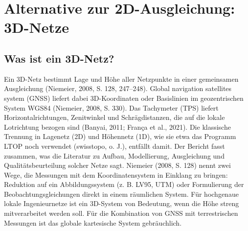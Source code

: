 \section{Alternative zur 2D-Ausgleichung: 3D-Netze}
\label{sec:literaturrecherche 3D-Netze}

\subsection{Was ist ein 3D-Netz?}
Ein 3D-Netz bestimmt Lage und Höhe aller Netzpunkte in einer gemeinsamen Ausgleichung (Niemeier, 2008, S. 128, 247–248). 
Global navigation satellites system (GNSS) liefert dabei 3D-Koordinaten oder Basislinien im geozentrischen System WGS84 (Niemeier, 2008, S. 330). 
Das Tachymeter (TPS) liefert Horizontalrichtungen, Zenitwinkel und Schrägdistanzen, die auf die lokale Lotrichtung bezogen sind (Banyai, 2011; França et al., 2021).
Die klassische Trennung in Lagenetz (2D) und Höhennetz (1D), wie sie etwa das Programm LTOP noch verwendet (swisstopo, o. J.), entfällt damit.
Der Bericht fasst zusammen, was die Literatur zu Aufbau, Modellierung, Ausgleichung und Qualitätsbeurteilung solcher Netze sagt.
Niemeier (2008, S. 128) nennt zwei Wege, die Messungen mit dem Koordinatensystem in Einklang zu bringen: Reduktion auf ein Abbildungssystem (z. B. LV95, UTM) oder Formulierung der Beobachtungsgleichungen direkt in einem räumlichen System. 
Für hochgenaue lokale Ingenieurnetze ist ein 3D-System von Bedeutung, wenn die Höhe streng mitverarbeitet werden soll. Für die Kombination von GNSS mit terrestrischen Messungen ist das globale kartesische System gebräuchlich.

